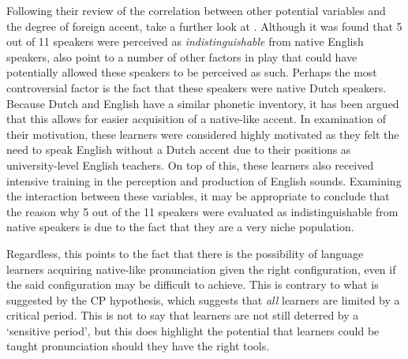 \documentclass
[
    a4paper,
    twoside,
    12pt,
]
{report}
\begin{document}
Following their review of the correlation between other potential
variables and the degree of foreign accent, \textcite{piske2001} take a
further look at \textcite{bongaerts1995}. Although it was found that 5
out of 11 speakers were perceived as \textit{indistinguishable} from
native English speakers, \textcite{piske2001} also point to a number of
other factors in play that could have potentially allowed these speakers
to be perceived as such. Perhaps the most controversial factor is the
fact that these speakers were native Dutch speakers. Because Dutch and
English have a similar phonetic inventory, it has been argued that this
allows for easier acquisition of a native-like accent. In examination of
their motivation, these learners were considered highly motivated as
they felt the need to speak English without a Dutch accent due to their
positions as university-level English teachers. On top of this, these
learners also received intensive training in the perception and
production of English sounds. Examining the interaction between these
variables, it may be appropriate to conclude that the reason why 5 out
of the 11 speakers were evaluated as indistinguishable from native
speakers is due to the fact that they are a very niche population.

Regardless, this points to the fact that there is the possibility of
language learners acquiring native-like pronunciation given the right
configuration, even if the said configuration may be difficult to
achieve. This is contrary to what is suggested by the CP hypothesis,
which suggests that \emph{all} learners are limited by a critical
period. This is not to say that learners are not still deterred by a
`sensitive period', but this does highlight the potential that learners
could be taught pronunciation should they have the right tools.
\end{document}
